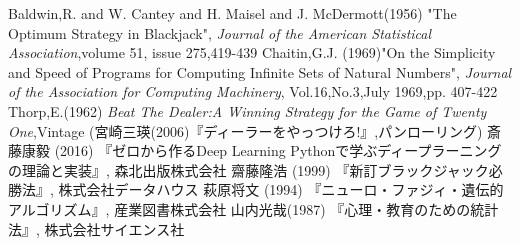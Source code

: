 \begin{thebibliography}{9}
   Baldwin,R. and W. Cantey and H. Maisel and J. McDermott(1956) "The Optimum Strategy in Blackjack", {\it{Journal of the American Statistical Association}},volume 51, issue 275,419-439
   Chaitin,G.J. (1969)"On the Simplicity and Speed of Programs for Computing Infinite Sets of Natural Numbers", {\it{Journal of the Association for Computing Machinery}}, Vol.16,No.3,July 1969,pp. 407-422
   Thorp,E.(1962) {\it{Beat The Dealer:A Winning Strategy for the Game of Twenty One}},Vintage (宮崎三瑛(2006)『ディーラーをやっつけろ!』,パンローリング)
   斎藤康毅 (2016) 『ゼロから作るDeep Learning Pythonで学ぶディープラーニングの理論と実装』, 森北出版株式会社
   齋藤隆浩 (1999) 『新訂ブラックジャック必勝法』, 株式会社データハウス
   萩原将文 (1994) 『ニューロ・ファジィ・遺伝的アルゴリズム』, 産業図書株式会社
   山内光哉(1987) 『心理・教育のための統計法』, 株式会社サイエンス社
\end{thebibliography}
